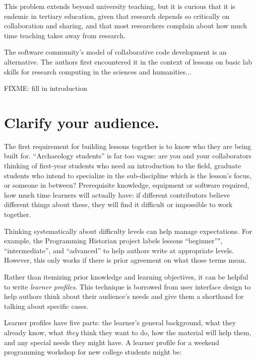 \documentclass[10pt,letterpaper]{article}
\newcommand{\rulemajor}[1]{\section{#1}}
\begin{document}
This problem extends beyond university teaching,
but it is curious that it is endemic in tertiary education,
given that research depends so critically on collaboration and sharing,
and that most researchers complain about how much time teaching takes away from research.

The software community's model of collaborative code development is an alternative.
The authors first encountered it in the context of
lessons on basic lab skills for research computing
in the sciences and humanities...

FIXME: fill in introduction

\rulemajor{Clarify your audience.}

The first requirement for building lessons together is
to know who they are being built for.
``Archaeology students'' is far too vague:
are you and your collaborators thinking of
first-year students who need an introduction to the field,
graduate students who intend to specialize in the sub-discipline which is the lesson's focus,
or someone in between?
Prerequisite knowledge,
equipment or software required,
how much time learners will actually have:
if different contributors believe different things about these,
they will find it difficult or impossible to work together.

Thinking systematically about difficulty levels can help manage expectations.
For example,
the Programming Historian project labels lessons ``beginner''",
``intermediate'',
and ``advanced''
to help authors write at appropriate levels.
However,
this only works if there is prior agreement on what those terms mean.

Rather than itemizing prior knowledge and learning objectives,
it can be helpful to write \emph{learner profiles}.
This technique is borrowed from user interface design
to help authors think about their audience's needs
and give them a shorthand for talking about specific cases.

Learner profiles have five parts:
the learner's general background,
what they already know,
what \emph{they} think they want to do,
how the material will help them,
and any special needs they might have.
A learner profile for a weekend programming workshop for new college students might be:
\end{document}
